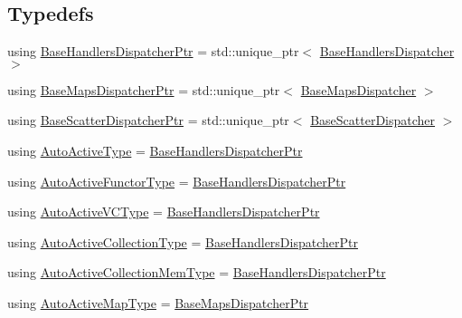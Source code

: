 \subsection*{Typedefs}
\begin{DoxyCompactItemize}
\item 
using \hyperlink{namespacevt_1_1auto__registry_a0166496b1137bbc1b20adfeb5e19cf0e}{Base\+Handlers\+Dispatcher\+Ptr} = std\+::unique\+\_\+ptr$<$ \hyperlink{structvt_1_1auto__registry_1_1_base_handlers_dispatcher}{Base\+Handlers\+Dispatcher} $>$
\item 
using \hyperlink{namespacevt_1_1auto__registry_aacf403872e2d1ae4d749738c02904c01}{Base\+Maps\+Dispatcher\+Ptr} = std\+::unique\+\_\+ptr$<$ \hyperlink{structvt_1_1auto__registry_1_1_base_maps_dispatcher}{Base\+Maps\+Dispatcher} $>$
\item 
using \hyperlink{namespacevt_1_1auto__registry_aba7be4c573c0f1361c024e4d3293a62a}{Base\+Scatter\+Dispatcher\+Ptr} = std\+::unique\+\_\+ptr$<$ \hyperlink{structvt_1_1auto__registry_1_1_base_scatter_dispatcher}{Base\+Scatter\+Dispatcher} $>$
\item 
using \hyperlink{namespacevt_1_1auto__registry_a2c91a60d4d3c0d80a563c3d4f54162eb}{Auto\+Active\+Type} = \hyperlink{namespacevt_1_1auto__registry_a0166496b1137bbc1b20adfeb5e19cf0e}{Base\+Handlers\+Dispatcher\+Ptr}
\item 
using \hyperlink{namespacevt_1_1auto__registry_a092979b3ed6cf9e21e6a5823fdaa0c12}{Auto\+Active\+Functor\+Type} = \hyperlink{namespacevt_1_1auto__registry_a0166496b1137bbc1b20adfeb5e19cf0e}{Base\+Handlers\+Dispatcher\+Ptr}
\item 
using \hyperlink{namespacevt_1_1auto__registry_a3e4aadbe33ef7af6d8b87f72876aee41}{Auto\+Active\+V\+C\+Type} = \hyperlink{namespacevt_1_1auto__registry_a0166496b1137bbc1b20adfeb5e19cf0e}{Base\+Handlers\+Dispatcher\+Ptr}
\item 
using \hyperlink{namespacevt_1_1auto__registry_a14267fe1eee84b3f2205aecac48cafe4}{Auto\+Active\+Collection\+Type} = \hyperlink{namespacevt_1_1auto__registry_a0166496b1137bbc1b20adfeb5e19cf0e}{Base\+Handlers\+Dispatcher\+Ptr}
\item 
using \hyperlink{namespacevt_1_1auto__registry_af5d102e15ae09e22dbc560f5b64ec758}{Auto\+Active\+Collection\+Mem\+Type} = \hyperlink{namespacevt_1_1auto__registry_a0166496b1137bbc1b20adfeb5e19cf0e}{Base\+Handlers\+Dispatcher\+Ptr}
\item 
using \hyperlink{namespacevt_1_1auto__registry_ae1bc8f9afc86cc589761fbbf22064601}{Auto\+Active\+Map\+Type} = \hyperlink{namespacevt_1_1auto__registry_aacf403872e2d1ae4d749738c02904c01}{Base\+Maps\+Dispatcher\+Ptr}

\end{DoxyCompactItemize}
